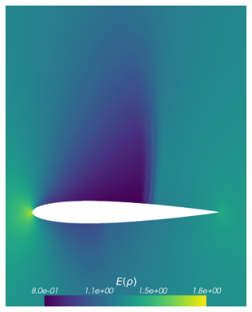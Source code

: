 \begin{figure}[h!]
\begin{subfigure}{0.329\linewidth}
		\includegraphics[width=\linewidth]{figs/Euler1DPlots5/osIPM4-4_ERho.png}
		\label{fig:sub1}
	\end{subfigure}\\
	\vspace{-0.35cm}
	\begin{subfigure}{0.329\linewidth}
		\centering

\end{subfigure}
\end{figure}
